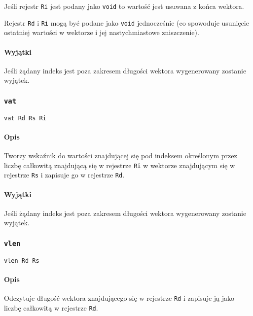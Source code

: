 Jeśli rejestr \texttt{Ri} jest podany jako \texttt{void} to wartość jest usuwana
z końca wektora.

Rejestr \texttt{Rd} i \texttt{Ri} mogą być podane jako \texttt{void}
jednocześnie (co spowoduje usunięcie ostatniej wartości w wektorze i jej
nastychmiastowe zniszczenie).

\paragraph*{Wyjątki} Jeśli żądany indeks jest poza zakresem długości wektora
wygenerowany zostanie wyjątek.

\subsubsection{\texttt{vat}}

\begin{lstlisting}
vat Rd Rs Ri
\end{lstlisting}

\paragraph*{Opis} Tworzy wskaźnik do wartości znajdującej się pod indeksem
określonym przez liczbę całkowitą znajdującą się w rejestrze \texttt{Ri} w
wektorze znajdującym się w rejestrze \texttt{Rs} i zapisuje go w rejestrze
\texttt{Rd}.

\paragraph*{Wyjątki} Jeśli żądany indeks jest poza zakresem długości wektora
wygenerowany zostanie wyjątek.

\subsubsection{\texttt{vlen}}

\begin{lstlisting}
vlen Rd Rs
\end{lstlisting}

\paragraph*{Opis} Odczytuje długość wektora znajdującego się w rejestrze
\texttt{Rd} i zapisuje ją jako liczbę całkowitą w rejestrze \texttt{Rd}.
